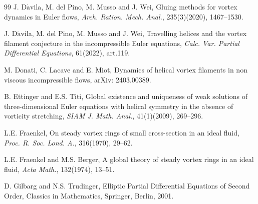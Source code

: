 \documentclass[12pt,reqno]{amsart}
\numberwithin{equation}{section}
\theoremstyle{definition}
\theoremstyle{remark}
\begin{document}
\begin{thebibliography}{99}
J. D$\acute{\text{a}}$vila, M. del Pino, M. Musso and J. Wei, Gluing methods for vortex dynamics in Euler flows, \textit{Arch. Ration. Mech. Anal.}, 235(3)(2020), 1467--1530.

J. D$\acute{\text{a}}$vila, M. del Pino, M. Musso and J. Wei, Travelling helices and the vortex filament conjecture
in the incompressible Euler equations, \textit{Calc. Var. Partial Differential Equations}, 61(2022), art.119.



M. Donati, C. Lacave  and E. Miot, Dynamics of helical vortex filaments in non viscous incompressible flows, arXiv: 2403.00389.








B. Ettinger and E.S. Titi, Global existence and uniqueness of weak solutions of three-dimensional Euler equations with helical symmetry in the absence of vorticity stretching, \textit{SIAM J. Math. Anal.}, 41(1)(2009), 269--296.


L.E. Fraenkel, On steady vortex rings of small cross-section in an ideal fluid, \textit{Proc. R. Soc. Lond. A.}, 316(1970), 29--62.

L.E. Fraenkel and M.S. Berger, A global theory of steady vortex rings in an ideal fluid, \textit{Acta Math.}, 132(1974), 13--51.



D. Gilbarg and N.S. Trudinger,  Elliptic Partial Differential Equations of Second Order, Classics in Mathematics, Springer, Berlin, 2001.



\end{thebibliography}
\end{document}
